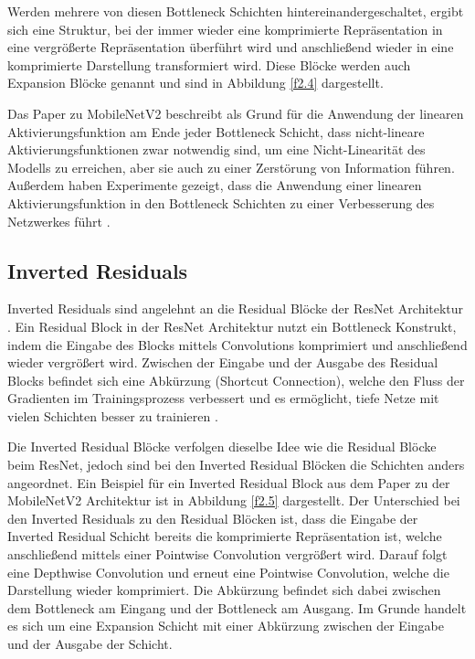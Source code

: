 Werden mehrere von diesen Bottleneck Schichten hintereinandergeschaltet, ergibt sich eine Struktur, bei der immer wieder eine komprimierte Repräsentation in eine vergrößerte Repräsentation überführt wird und anschließend wieder in eine komprimierte Darstellung transformiert wird. Diese Blöcke werden auch Expansion Blöcke genannt und sind in Abbildung \ref{f2.4} dargestellt.

Das Paper zu MobileNetV2 beschreibt als Grund für die Anwendung der linearen Aktivierungsfunktion am Ende jeder Bottleneck Schicht, dass nicht-lineare Aktivierungsfunktionen zwar notwendig sind, um eine Nicht-Linearität des Modells zu erreichen, aber sie auch zu einer Zerstörung von Information führen. Außerdem haben Experimente gezeigt, dass die Anwendung einer linearen Aktivierungsfunktion in den Bottleneck Schichten zu einer Verbesserung des Netzwerkes führt \cite{sandler_mobilenetv2_2019}.


\subsection{Inverted Residuals}
\label{inverted_residuals}
Inverted Residuals \cite{sandler_mobilenetv2_2019} sind angelehnt an die Residual Blöcke der ResNet Architektur \cite{he_deep_2015}. Ein Residual Block in der ResNet Architektur nutzt ein Bottleneck Konstrukt, indem die Eingabe des Blocks mittels Convolutions komprimiert und anschließend wieder vergrößert wird. Zwischen der Eingabe und der Ausgabe des Residual Blocks befindet sich eine Abkürzung (Shortcut Connection), welche den Fluss der Gradienten im Trainingsprozess verbessert und es ermöglicht, tiefe Netze mit vielen Schichten besser zu trainieren \cite{he_deep_2015}.

Die Inverted Residual Blöcke verfolgen dieselbe Idee wie die Residual Blöcke beim ResNet, jedoch sind bei den Inverted Residual Blöcken die Schichten anders angeordnet. Ein Beispiel für ein Inverted Residual Block aus dem Paper zu der MobileNetV2 Architektur \cite{sandler_mobilenetv2_2019} ist in Abbildung \ref{f2.5} dargestellt. Der Unterschied bei den Inverted Residuals zu den Residual Blöcken ist, dass die Eingabe der Inverted Residual Schicht bereits die komprimierte Repräsentation ist, welche anschließend mittels einer Pointwise Convolution vergrößert wird. Darauf folgt eine Depthwise Convolution und erneut eine Pointwise Convolution, welche die Darstellung wieder komprimiert. Die Abkürzung befindet sich dabei zwischen dem Bottleneck am Eingang und der Bottleneck am Ausgang. Im Grunde handelt es sich um eine Expansion Schicht mit einer Abkürzung zwischen der Eingabe und der Ausgabe der Schicht.

